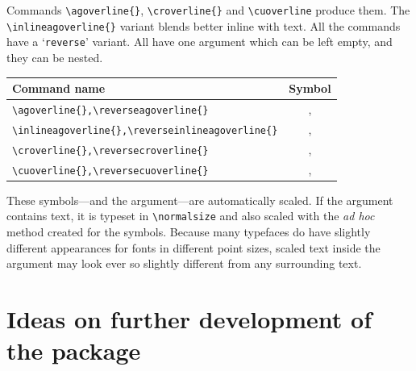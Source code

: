 \documentclass[a4paper,justified]{tufte-handout}
\newcommand{\idxskipamount}{\hspace*{0.5cm}}
\begin{document}
Commands \verb|\agoverline{}|, \verb|\croverline{}| and \verb|\cuoverline| produce them. The \verb|\inlineagoverline{}| variant blends better inline with text. All the commands have a `\texttt{reverse}' variant. All have one argument which can be left empty, and they can be nested. 
\vspace*{0.5cm}

\renewcommand{\arraystretch}{1.2}
\setlength\arrayrulewidth{0.1pt}
\begin{tabular}{lc}%
Command name\hspace*{2.5cm}& Symbol\\
\hline
\verb|\agoverline{},\reverseagoverline{}| & \agoverline{},\reverseagoverline{}\\
\verb|\inlineagoverline{},\reverseinlineagoverline{}| & \inlineagoverline{},\reverseinlineagoverline{}\\
\verb|\croverline{},\reversecroverline{}| & \croverline{},\reversecroverline{}\\
\verb|\cuoverline{},\reversecuoverline{}| & \cuoverline{},\reversecuoverline{}
\end{tabular}%
\index[visual]{w@\agoverline{} \ \reverseagoverline{} \ \croverline{} \ \reversecroverline{} \ \cuoverline{} \ \reversecuoverline{} \idxskipamount }%
%
%
%
%
%
%
%
\vspace*{0.5cm}

\noindent These symbols---and the argument---are automatically scaled. If the argument contains text, it is typeset in \verb|\normalsize| and also scaled with the \textit{ad hoc} method created for the symbols. Because many typefaces do have slightly different appearances for fonts in different point sizes, scaled text inside the argument may look ever so slightly different from any surrounding text.\bigskip\bigskip

\section{\hspace*{-15pt}Ideas on further development of the package}\label{furtherdevelopments}
\end{document}
